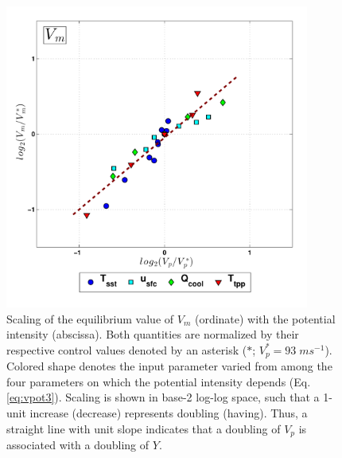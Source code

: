 \documentclass[12pt]{article}
\begin{document}
\begin{figure}[h!]
\centering
  \noindent\includegraphics[width=10cm,height=10cm]{FIGURES_TC_RCE_equilibrium_v2.0/Fig3_MPI_collapse_V.pdf}
\caption{Scaling of the equilibrium value of $V_m$ (ordinate) with the potential intensity (abscissa). Both quantities are normalized by their respective control values denoted by an asterisk ($*$; $V^*_p = 93 \; ms^{-1}$). Colored shape denotes the input parameter varied from among the four parameters on which the potential intensity depends (Eq. \eqref{eq:vpot3}). Scaling is shown in base-2 log-log space, such that a 1-unit increase (decrease) represents doubling (having).  Thus, a straight line with unit slope indicates that a doubling of $V_p$ is associated with a doubling of $Y$.}
\label{fig:mpicollapse_V}
\end{figure}
\end{document}
